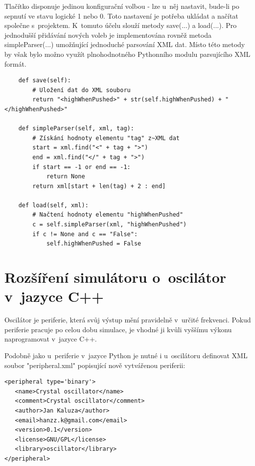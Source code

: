 Tlačítko disponuje jedinou konfigurační volbou - lze u~něj nastavit, bude-li po sepnutí ve stavu logické 1 nebo 0. Toto nastavení je potřeba ukládat a načítat společne s~projektem. K~tomuto účelu slouží metody save(...) a load(...). Pro jednodušší přidávání nových voleb je implementována rovněž metoda simpleParser(...) umožňující jednoduché parsování XML dat. Místo této metody by však bylo možno využít plnohodnotného Pythonního modulu parsujícího XML formát.
\begin{lstlisting}
	def save(self):
		# Uložení dat do XML souboru
		return "<highWhenPushed>" + str(self.highWhenPushed) + "</highWhenPushed>"

	def simpleParser(self, xml, tag):
		# Získání hodnoty elementu "tag" z~XML dat
		start = xml.find("<" + tag + ">")
		end = xml.find("</" + tag + ">")
		if start == -1 or end == -1:
			return None
		return xml[start + len(tag) + 2 : end]

	def load(self, xml):
		# Načtení hodnoty elementu "highWhenPushed"
		c = self.simpleParser(xml, "highWhenPushed")
		if c != None and c == "False":
			self.highWhenPushed = False
\end{lstlisting}

\section{Rozšíření simulátoru o~oscilátor v~jazyce C++}
\label{oscilator}

Oscilátor je periferie, která svůj výstup mění pravidelně v~určité frekvenci. Pokud periferie pracuje po celou dobu simulace, je vhodné ji kvůli vyššímu výkonu naprogramovat v~jazyce C++.

Podobně jako u~periferie v~jazyce Python je nutné i u~oscilátoru definovat XML soubor "peripheral.xml" popisující nově vytvářenou periferii:

\lstset{language=XML, numbers=left, frame=single, breaklines=true, tabsize=2, xleftmargin=20pt}
\begin{lstlisting}
<peripheral type='binary'>
   <name>Crystal oscillator</name>
   <comment>Crystal oscillator</comment>
   <author>Jan Kaluza</author>
   <email>hanzz.k@gmail.com</email>
   <version>0.1</version>
   <license>GNU/GPL</license>
   <library>oscillator</library>
</peripheral>
\end{lstlisting}

